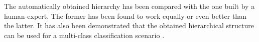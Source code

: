 The automatically obtained hierarchy has been compared with the one built by a human-expert. The former has been found to work equally or even better than the latter. It has also been demonstrated that the obtained hierarchical structure can be used for a multi-class classification scenario \parencite{malinen2014balanced}.  







